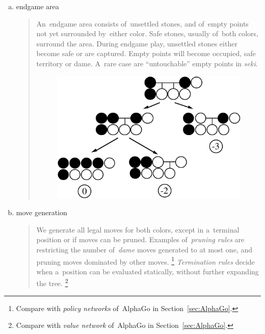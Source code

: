 \begin{enumerate}[(a)]
  \item endgame area
    \begin{quotation} \noindent
      An~endgame area consists of~unsettled stones, and of~empty points not yet surrounded by~either color.
      Safe stones, usually of~both colors, surround the area.
      During endgame play, unsettled stones either become safe or are captured.
      Empty points will become occupied, safe territory or dame.
      A~rare case are ``untouchable'' empty points in \emph{seki}.

      \begin{figure}[H]
        \centering
        \includegraphics[width=.7\textwidth]{../img/Go_search_tree.png}
      \end{figure}
    \end{quotation}

  \item move generation
    \begin{quotation} \noindent
      We generate all legal moves for both colors, except in a~terminal position or if moves can be pruned.
      Examples of~\emph{pruning rules} are restricting the number of~\emph{dame} moves generated to at most one, and pruning moves dominated by other moves.%
      \footnote{Compare with \emph{policy networks} of~AlphaGo in Section~\ref{sec:AlphaGo}.}
      \emph{Termination rules} decide when a~position can be evaluated statically, without further expanding the tree.%
      \footnote{Compare with \emph{value network} of~AlphaGo in Section~\ref{sec:AlphaGo}.}
    \end{quotation}


\end{enumerate}
